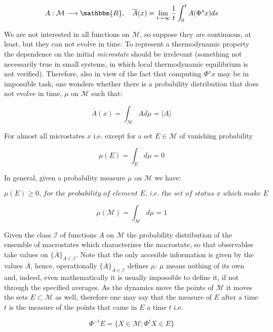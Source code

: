 \documentclass{article}
\begin{document}
$$A:\mathcal{M}\longrightarrow \mathbbm{R}, \quad \overline{A}(x)=\lim\limits_{t \to \infty} \frac{1}{t} \int_{0}^{t} A(\Phi^s x) ds$$

We are not interested in all functions on $\mathcal{M}$, so suppose they are continuous, at least, but they can not evolve in time. To represent a thermodynamic property the dependence on the initial \emph{microstate} should be irrelevant (something not necessarily true in small systems, in which local thermodynamic equilibrium is not verified). Therefore, also in view of the fact that computing $\Phi^s x$ may be in impossible task, one wonders whether there is a probability distribution that does not evolve in time, $\mu$ on $\mathcal{M}$ such that:

\begin{equation}
\overline{A}(x) = \int_{\mathcal{M}} A d\mu = \langle A \rangle
\end{equation}

For almost all microstates $x$ i.e. except for a set $E \in \mathcal{M}$ of vanishing probability 

$$\mu(E)=\int_{E} d\mu =0$$

In general, given a probability measure $\mu$ on $\mathcal{M}$ we have:

\begin{equation}
\mu(E) \geq 0 \textit{, for the probability of element $E$, i.e. the set of status x which make E}
\end{equation}

\begin{equation}
\mu(\mathcal{M}) = \int_{\mathcal{M}} d \mu = 1
\end{equation}

 Given the class $\mathcal{I}$ of functions $A$ on $\mathcal{M}$ the probability distribution of the ensemble of macrostates which characterizes the macrostate, so that observables take values on $\{ \overline{A} \}_{A \in \mathcal{I}}$.
 Note that the only accesible information is given by the values $\overline{A}$, hence, operationally $\{ \overline{A} \}_{A \in \mathcal{I}}$ defines $\mu$: $\mu$ means nothing of its own and, indeed, even mathematically it is usually impossible to define it, if not through the specified averages.
 As the dynamics move the points of $\mathcal{M}$ it moves the sets $E \subset \mathcal{M}$ as well, therefore one may say that the measure of $E$ after a time $t$ is the measure of the points that came in $E$ a time $t$ i.e. 
 
 $$ \Phi^{-t} E = \{ X \in \mathcal{M} :  \Phi^{t} X \in  E  \}$$ 
\end{document}
